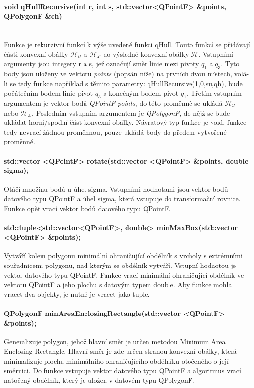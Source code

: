 \documentclass[11pt]{article}
\begin{document}
	\paragraph{void qHullRecursive(int r, int s, std::vector<QPointF> \&points, QPolygonF \&ch)}\mbox{}\\
	Funkce je rekurzivní funkcí k výše uvedené funkci qHull. Touto funkcí se přidávají části konvexní obálky $\mathcal{H_U}$ a $\mathcal{H_L}$ do výsledné konvexní obálky $\mathcal{H}$.
 	Vstupními argumenty jsou integery r a s, jež označují směr linie mezi pivoty \textit{$ q_1 $} a \textit{$ q_3 $}. Tyto body jsou uloženy ve vektoru \textit{points} (popsán níže) na prvních dvou místech, volá-li se tedy funkce například s těmito parametry: qHullRecursive(1,0,su,qh), bude počátečním bodem linie pivot \textit{$ q_3 $} a konečným bodem pivot \textit{$ q_1 $}. Třetím vstupním argumentem je vektor bodů \textit{QPointF} \textit{points}, do této proměnné se ukládá  $\mathcal{H_U}$ nebo $\mathcal{H_L}$. Posledním vstupním argumentem je \textit{QPolygonF}, do nějž se bude ukládat horní/spodní část konvexní obálky. Návratový typ funkce je void, funkce tedy nevrací žádnou proměnnou, pouze ukládá body do předem vytvořené proměnné.
 	
 	\paragraph{std::vector <QPointF> rotate(std::vector <QPointF> \&points, double sig\-ma);}
 	Otáčí množinu bodů u úhel sigma. Vstupními hodnotami jsou vektor bodů datového typu QPointF a úhel sigma, která vstupuje do transformační rovnice. Funkce opět vrací vektor bodů datového typu QPointF.
 	
 	\paragraph{std::tuple<std::vector<QPointF>, double> minMaxBox(std::vector  <QPoi\-ntF> \&points);}
 	Vytváří kolem polygonu minimální ohraničující obdélník s vrcholy s extrémními souřadnicemi polygonu, nad kterým se obdélník vytváří. Vstupní hodnotou je vektor datového typu QPointF. Funkce vrací minimální ohraničující obdélník ve vektoru QPointF a jeho plochu s datovým typem double. Aby funkce mohla vracet dva objekty, je nutné je vracet jako tuple.
 	
 	\paragraph{QPolygonF minAreaEnclosingRectangle(std::vector <QPointF> \&points);}
 	Generalizuje polygon, jehož hlavní směr je určen metodou Minimum Area Enclosing Rectangle. Hlavní směr je zde určen stranou konvexní obálky, která minimalizuje plochu minimálního ohraničujícího obdélníku otočeného o její směrnici. Do funkce vstupuje vektor datového typu QPointF a algoritmus vrací natočený obdélník, který je uložen v datovém typu QPolygonF.
 	
\end{document}
